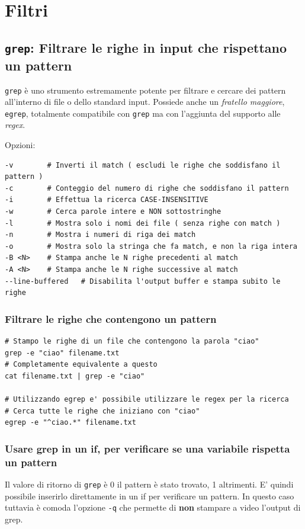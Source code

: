 \documentclass[a4paper]{report}
\newenvironment{code}{\begin{tcolorbox}[size=small]}{\end{tcolorbox}}
\begin{document}
\chapter{Filtri}

\section{\texttt{grep}: Filtrare le righe in input che rispettano un pattern }

\texttt{grep} è uno strumento estremamente potente per filtrare e cercare dei pattern all'interno di file o dello standard input. 
Possiede anche un \textit{fratello maggiore}, \texttt{egrep}, totalmente compatibile con \texttt{grep} ma con l'aggiunta del supporto alle \textit{regex}.

Opzioni:
\begin{code}
\begin{lstlisting}
-v        # Inverti il match ( escludi le righe che soddisfano il pattern )
-c        # Conteggio del numero di righe che soddisfano il pattern
-i        # Effettua la ricerca CASE-INSENSITIVE
-w        # Cerca parole intere e NON sottostringhe
-l        # Mostra solo i nomi dei file ( senza righe con match )
-n        # Mostra i numeri di riga dei match
-o        # Mostra solo la stringa che fa match, e non la riga intera
-B <N>    # Stampa anche le N righe precedenti al match
-A <N>    # Stampa anche le N righe successive al match
--line-buffered   # Disabilita l'output buffer e stampa subito le righe
\end{lstlisting}
\end{code}

\subsection{Filtrare le righe che contengono un pattern}

\begin{code}
\begin{lstlisting}
# Stampo le righe di un file che contengono la parola "ciao"
grep -e "ciao" filename.txt
# Completamente equivalente a questo
cat filename.txt | grep -e "ciao"

# Utilizzando egrep e' possibile utilizzare le regex per la ricerca
# Cerca tutte le righe che iniziano con "ciao"
egrep -e "^ciao.*" filename.txt
\end{lstlisting}
\end{code}

\subsection{Usare grep in un if, per verificare se una variabile rispetta un pattern}
Il valore di ritorno di \texttt{grep} è 0 il pattern è stato trovato, 1 altrimenti. E' quindi possibile inserirlo direttamente in un if per verificare un pattern. In questo caso tuttavia è comoda l'opzione \texttt{-q} che permette di \textbf{non} stampare a video l'output di grep.
\end{document}
